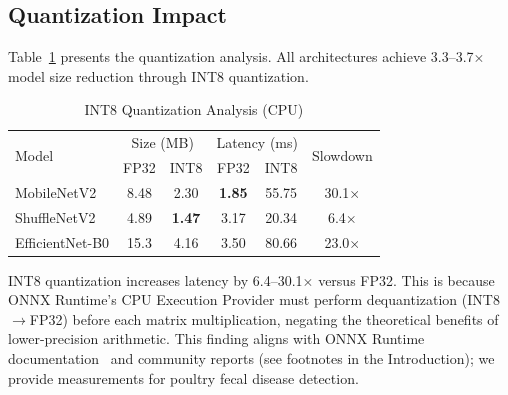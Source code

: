 \documentclass[conference,a4paper]{IEEEtran}
\begin{document}
\subsection{Quantization Impact}

Table~\ref{tab:quantization} presents the quantization analysis. All architectures achieve 3.3--3.7$\times$ model size reduction through INT8 quantization.

\begin{table}[htbp]
\caption{INT8 Quantization Analysis (CPU)}
\label{tab:quantization}
\centering
\begin{tabular}{lccccc}
\toprule
\multirow{2}{*}{Model} & \multicolumn{2}{c}{Size (MB)} & \multicolumn{2}{c}{Latency (ms)} & \multirow{2}{*}{Slowdown} \\
 & FP32 & INT8 & FP32 & INT8 & \\
\midrule
MobileNetV2 & 8.48 & 2.30 & \textbf{1.85} & 55.75 & 30.1$\times$ \\
ShuffleNetV2 & 4.89 & \textbf{1.47} & 3.17 & 20.34 & 6.4$\times$ \\
EfficientNet-B0 & 15.3 & 4.16 & 3.50 & 80.66 & 23.0$\times$ \\
\bottomrule
\end{tabular}
\end{table}

INT8 quantization increases latency by 6.4--30.1$\times$ versus FP32. This is because ONNX Runtime's CPU Execution Provider must perform dequantization (INT8$\rightarrow$FP32) before each matrix multiplication, negating the theoretical benefits of lower-precision arithmetic. This finding aligns with ONNX Runtime documentation~\cite{onnxruntime2024} and community reports (see footnotes in the Introduction); we provide measurements for poultry fecal disease detection.

\begin{table}[htbp]
\caption{FP32 vs INT8 accuracy (publisher test split, \texttt{eval\_int8.py}); per-class cocci / healthy / ncd / salmo. MN2 and SNV2 robust; EB0 collapses (salmo 0.53\%).}
\label{tab:quantacc}
\centering
\footnotesize
\setlength{\tabcolsep}{3.0pt}
\end{table}
\end{document}
